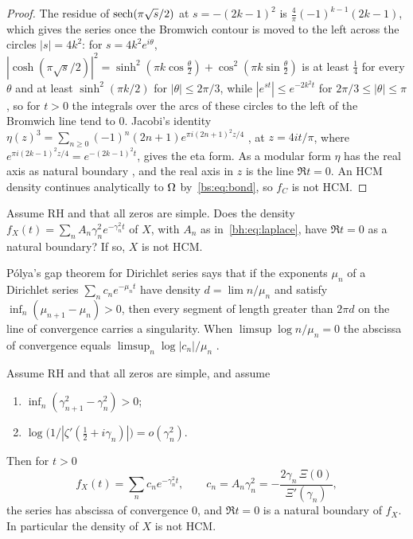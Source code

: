 \begin{proof}
The residue of $\operatorname{sech}(\pi\sqrt s/2)$ at $s=-(2k-1)^2$ is $\frac4\pi(-1)^{k-1}(2k-1)$, which gives the series once the Bromwich contour is moved to the left across the circles $|s|=4k^2$: for $s=4k^2e^{i\theta}$, $|\cosh(\pi\sqrt s/2)|^2=\sinh^2(\pi k\cos\frac\theta2)+\cos^2(\pi k\sin\frac\theta2)$ is at least $\frac14$ for every $\theta$ and at least $\sinh^2(\pi k/2)$ for $|\theta|\le2\pi/3$, while $|e^{st}|\le e^{-2k^2t}$ for $2\pi/3\le|\theta|\le\pi$, so for $t>0$ the integrals over the arcs of these circles to the left of the Bromwich line tend to $0$. Jacobi's identity $\eta(z)^3=\sum_{n\ge0}(-1)^n(2n+1)e^{\pi i(2n+1)^2z/4}$ \cite[Theorem 357]{boHardyWright}, at $z=4it/\pi$, where $e^{\pi i(2k-1)^2z/4}=e^{-(2k-1)^2t}$, gives the eta form. As a modular form $\eta$ has the real axis as natural boundary \cite[Chapter 11, Section 1.4, and Chapter 1, Section 4.2]{Remmert98}, and the real axis in $z$ is the line $\Re t=0$. An HCM density continues analytically to $\Omega$ by~\eqref{bs:eq:bond}, so $f_C$ is not HCM.
\end{proof}

\begin{question}\label{bs:q:two}
Assume RH and that all zeros are simple. Does the density $f_X(t)=\sum_n A_n\gamma_n^2e^{-\gamma_n^2t}$ of $X$, with $A_n$ as in~\eqref{bh:eq:laplace}, have $\Re t=0$ as a natural boundary? If so, $X$ is not HCM.
\end{question}

P\'olya's gap theorem for Dirichlet series \cite{boPolya23,boPolya} says that if the exponents $\mu_n$ of a Dirichlet series $\sum_nc_ne^{-\mu_nt}$ have density $d=\lim n/\mu_n$ and satisfy $\inf_n(\mu_{n+1}-\mu_n)>0$, then every segment of length greater than $2\pi d$ on the line of convergence carries a singularity. When $\limsup\log n/\mu_n=0$ the abscissa of convergence equals $\limsup_n\log|c_n|/\mu_n$ \cite{boMandelbrojt}.

\begin{theorem}\label{bs:thm:nb}
Assume RH and that all zeros are simple, and assume
\begin{enumerate}
\item[(G)] $\inf_n(\gamma_{n+1}^2-\gamma_n^2)>0$;
\item[(D)] $\log\bigl(1/|\zeta'(\frac12+i\gamma_n)|\bigr)=o(\gamma_n^2)$.
\end{enumerate}
Then for $t>0$
\[
f_X(t)=\sum_nc_ne^{-\gamma_n^2t},\qquad c_n=A_n\gamma_n^2=-\frac{2\gamma_n\,\Xi(0)}{\Xi'(\gamma_n)},
\]
the series has abscissa of convergence $0$, and $\Re t=0$ is a natural boundary of $f_X$. In particular the density of $X$ is not HCM.
\end{theorem}

